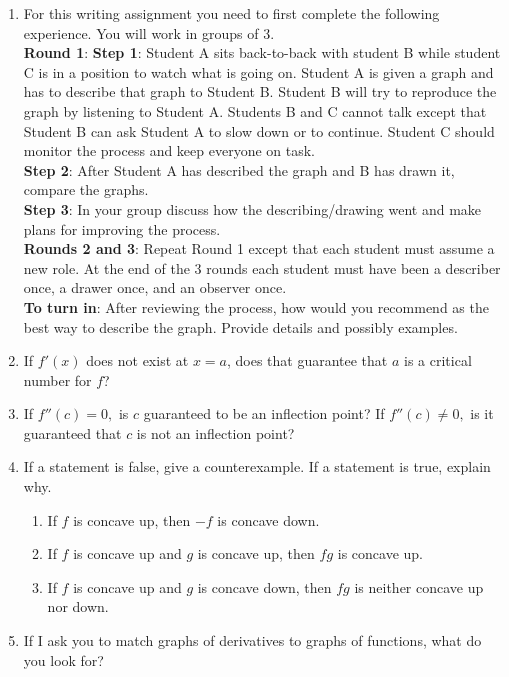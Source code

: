 \begin{enumerate}
\item  For this writing assignment you need to first complete the following experience.  You will work in groups of 3.  
\\ {\bf{Round 1}}:  {\bf{Step 1}}:  Student A sits back-to-back with student B while student C is in a position to watch what is going on.  Student A is given a graph and has to describe that graph to Student B.  Student B will try to reproduce the graph by listening to Student A.  Students B and C cannot talk except that Student B can ask Student A to slow down or to continue.  Student C should monitor the process and keep everyone on task.  
\\ {\bf{Step 2}}: After Student A has described the graph and B has drawn it, compare the graphs.
\\{\bf{Step 3}}:  In your group discuss how the describing/drawing went and make plans for improving the process.
\\{\bf{Rounds 2 and 3}}:  Repeat Round 1 except that each student must assume a new role.  At the end of the 3 rounds each student must have been a describer once, a drawer once, and an observer once.
\\{\bf{To turn in}}: After reviewing the process, how would you recommend as the best way to describe the graph.  Provide details and possibly examples.

\item  If $f'(x)$ does not exist at $x = a$, does that guarantee that $a$ is a critical number for $f$?

\item  If $f''(c) = 0,$ is $c$ guaranteed to be an inflection point?  If $f''(c) \ne 0,$ is it guaranteed that  $c$ is not an inflection point?

\item  If a statement is false, give a counterexample.  If a statement is true, explain why. \begin{enumerate}
\item If $f$ is concave up, then $-f$ is concave down.
\item If $f$ is concave up and $g$ is concave up, then $fg$ is concave up.
\item If $f$ is concave up and $g$ is concave down, then $fg$ is neither concave up nor down. \end{enumerate}

\item  If I ask you to match graphs of derivatives to graphs of functions, what do you look for?


\end{enumerate}
